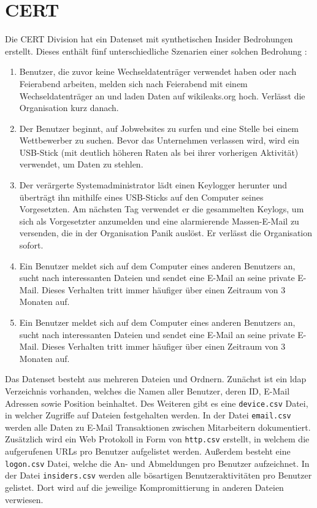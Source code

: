 \documentclass[
    12pt, %
    DIV10,
    ngerman, %
    a4paper, %
    oneside, %
    titlepage, %
    parskip=half, %
    headings=normal, %
    listof=totoc, %
    bibliography=totoc, %
    index=totoc, %
    captions=tableheading, %
    final %
]{scrreprt}
\begin{document}
\section{CERT}
Die CERT Division hat ein Datenset mit synthetischen Insider Bedrohungen erstellt. Dieses enthält fünf unterschiedliche Szenarien einer solchen Bedrohung \parencite{glasser2013bridging}:
\begin{enumerate}
\item Benutzer, die zuvor keine Wechseldatenträger verwendet haben oder nach Feierabend arbeiten, melden sich nach Feierabend mit einem Wechseldatenträger an und laden Daten auf wikileaks.org hoch. Verlässt die Organisation kurz danach.
\item Der Benutzer beginnt, auf Jobwebsites zu surfen und eine Stelle bei einem Wettbewerber zu suchen. Bevor das Unternehmen verlassen wird, wird ein USB-Stick (mit deutlich höheren Raten als bei ihrer vorherigen Aktivität) verwendet, um Daten zu stehlen.
\item Der verärgerte Systemadministrator lädt einen Keylogger herunter und überträgt ihn mithilfe eines USB-Sticks auf den Computer seines Vorgesetzten. Am nächsten Tag verwendet er die gesammelten Keylogs, um sich als Vorgesetzter anzumelden und eine alarmierende Massen-E-Mail zu versenden, die in der Organisation Panik auslöst. Er verlässt die Organisation sofort.
\item Ein Benutzer meldet sich auf dem Computer eines anderen Benutzers an, sucht nach interessanten Dateien und sendet eine E-Mail an seine private E-Mail. Dieses Verhalten tritt immer häufiger über einen Zeitraum von 3 Monaten auf.
\item Ein Benutzer meldet sich auf dem Computer eines anderen Benutzers an, sucht nach interessanten Dateien und sendet eine E-Mail an seine private E-Mail. Dieses Verhalten tritt immer häufiger über einen Zeitraum von 3 Monaten auf.
\end{enumerate}
Das Datenset besteht aus mehreren Dateien und Ordnern. Zunächst ist ein \ac{ldap} Verzeichnis vorhanden, welches die Namen aller Benutzer, deren ID, E-Mail Adressen sowie Position beinhaltet. Des Weiteren gibt es eine \texttt{device.csv} Datei, in welcher Zugriffe auf Dateien festgehalten werden. In der Datei \texttt{email.csv} werden alle Daten zu E-Mail Transaktionen zwischen Mitarbeitern dokumentiert. Zusätzlich wird ein Web Protokoll in Form von \texttt{http.csv} erstellt, in welchem die aufgerufenen URLs pro Benutzer aufgelistet werden. Außerdem besteht eine \texttt{logon.csv} Datei, welche die An- und Abmeldungen pro Benutzer aufzeichnet. In der Datei \texttt{insiders.csv} werden alle bösartigen Benutzeraktivitäten pro Benutzer gelistet. Dort wird auf die jeweilige Kompromittierung in anderen Dateien verwiesen.
\end{document}

